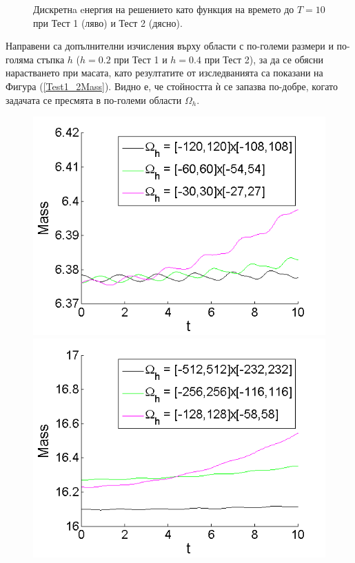 \documentclass[a5paper]{article}
\newcommand{\rf}[1]{(\ref{#1})}
\theoremstyle{remark}
\begin{document}
\begin{large}
\begin{figure}[ht]
\caption{Дискретнa eнергия на решението като функция на времето до $T=10$ при Тест 1 (ляво) и Тест 2 (дясно).}
\label{EnTest1Test2}
\FloatBarrier
\end{figure}
Направени са допълнителни изчисления върху области с по-големи размери и по-голяма стъпка $h$ ($h=0.2$ при Тест 1 и $h=0.4$ при Тест 2), за да се обясни нарастването при масата, като резултатите от изследванията са показани на Фигура \rf{Test1_2Mass}. Видно е, че стойността ѝ се запазва по-добре, когато задачата се пресмята в по-големи области $\Omega_h$. 
\begin{figure}[ht]\vspace{0.2cm}
	\begin{minipage}[b]{0.51\linewidth}
		\includegraphics[width=\linewidth]{Mass/MassTaylor_120_60_30_ZB1_bt3_c045_h020_O(h^6).png}
	\end{minipage}	
	\begin{minipage}[b]{0.51\linewidth}
		\includegraphics[width=\linewidth]{Mass/MassTaylor_512_256_128_ZB1_bt1_c090_h040_O(h^6).png}		

\end{minipage}
\end{figure}
\end{large}
\end{document}
